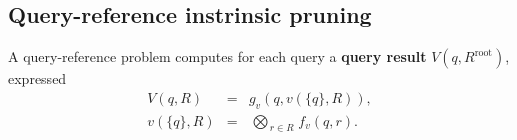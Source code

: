 \documentclass[twoside,leqno,twocolumn]{article}
\newcommand{\bigvec}[1]{\mathop{\overrightarrow{#1}}}
\newcommand{\summary}{\delta}
\newcommand{\defterm}[1]{{\bf #1}}
\newcommand{\kdroot}[1]{#1^{\text{root}}}
\newcommand{\lo}[1]{#1^{l}}
\newcommand{\up}[1]{#1^{u}}
\newcommand{\distlo}{\lo{d}}
\newcommand{\distup}{\up{d}}
\newcommand{\dist}[2]{d(#1,#2)}
\newcommand{\nameOp}[2]{\mathop{#1\nolimits\!\!_{#2}}}
\newcommand{\nameop}[2]{{\scriptstyle\:}#1_{\!#2}}
\newcommand{\myOp}[1]{\nameOp{\bigotimes}{#1}}
\newcommand{\myop}[1]{\nameop{\otimes}{#1}}
\newcommand{\letterglob}{\psi}
\newcommand{\opglob}{\myop{\letterglob}}
\newcommand{\fglob}{f_{\!\letterglob}}
\newcommand{\canpruneglob}{C_{\!\letterglob}}
\newcommand{\deltaglob}{\summary_{\!\letterglob}}
\newcommand{\letterqr}{v}
\newcommand{\outqr}{V}
\newcommand{\Opqr}{\myOp{\letterqr}}
\newcommand{\fqr}{f_{\!\letterqr}}
\newcommand{\gqr}{g_{\!\letterqr}}
\newcommand{\inqrv}{v}
\newcommand{\letterstat}{s}
\newcommand{\outstat}{\sigma}
\newcommand{\opstat}{\myop{\letterstat}}
\newcommand{\fstat}{f_{\!\letterstat}}
\begin{document}
%


\subsection{Query-reference instrinsic pruning}
A query-reference problem computes for each query a \defterm{query result} $\outqr(q, \kdroot{R})$, expressed
\begin{eqnarray}
\outqr(q, R) &=& \gqr(q, \inqrv(\{q\}, R)),
\\
\inqrv(\{q\}, R) &=& \Opqr_{r \in R} \fqr(q, r).
\label{eqn:qrdef}
\end{eqnarray}
\end{document}
